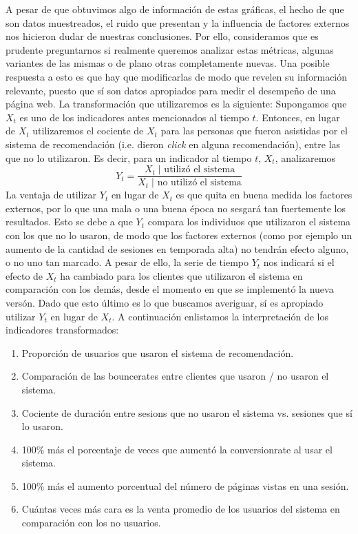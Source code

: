 \documentclass[12pt]{report}
\begin{document}
A pesar de que obtuvimos algo de información de estas gráficas, el hecho de que son datos muestreados, el ruido que presentan y la influencia de factores externos nos hicieron dudar de nuestras conclusiones. Por ello, consideramos que es prudente preguntarnos si realmente queremos analizar estas métricas, algunas variantes de las mismas o de plano otras completamente nuevas. Una posible respuesta a esto es que hay que modificarlas de modo que revelen su información relevante, puesto que sí son datos apropiados para medir el desempeño de una página web. La transformación que utilizaremos es la siguiente: Supongamos que $X_t$ es uno de los indicadores antes mencionados al tiempo $t$. Entonces, en lugar de $X_t$ utilizaremos el cociente de $X_t$ para las personas que fueron asistidas por el sistema de recomendación (i.e. dieron \emph{click} en alguna recomendación), entre las que no lo utilizaron. Es decir, para un indicador al tiempo $t$, $X_t$, analizaremos
\[
Y_t = \frac{X_t \; | \text{ utilizó el sistema}}{X_t \; | \text{ no utilizó el sistema}}
\]
La ventaja de utilizar $Y_t$ en lugar de $X_t$ es que quita en buena medida los factores externos, por lo que una mala o una buena época no sesgará tan fuertemente los resultados. Esto se debe a que $Y_t$ compara los individuos que utilizaron el sistema con los que no lo usaron, de modo que los factores externos (como por ejemplo un aumento de la cantidad de sesiones en temporada alta) no tendrán efecto alguno, o no uno tan marcado. A pesar de ello, la serie de tiempo $Y_t$ nos indicará si el efecto de $X_t$ ha cambiado para los clientes que utilizaron el sistema en comparación con los demás, desde el momento en que se implementó la nueva versón. Dado que esto último es lo que buscamos averiguar, sí es apropiado utilizar $Y_t$ en lugar de $X_t$. A continuación enlistamos la interpretación de los indicadores transformados:
\begin{enumerate}
	\item Proporción de usuarios que usaron el sistema de recomendación.
	\item Comparación de las \glspl{bouncerate} entre clientes que usaron / no usaron el sistema.
	\item Cociente de duración entre \glspl{sesion} que no usaron el sistema vs. sesiones que sí lo usaron.
	\item 100\% más el porcentaje de veces que aumentó la \gls{conversionrate} al usar el sistema.
	\item 100\% más el aumento porcentual del número de páginas vistas en una sesión.
	\item Cuántas veces más cara es la venta promedio de los usuarios del sistema en comparación con los no usuarios.
\end{enumerate}
\end{document}
